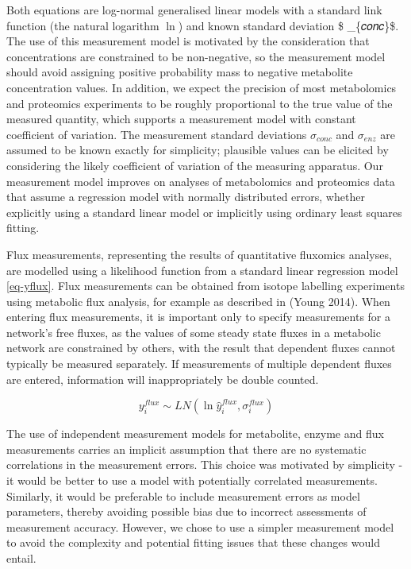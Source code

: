 \documentclass[journal=asbcd6,manuscript=article,layout=traditional]{achemso}
\begin{document}
Both equations are log-normal generalised linear models with a standard
link function (the natural logarithm \(\ln\)) and known standard
deviation \$ \sigma\_\{𝑐𝑜𝑛𝑐\}\$. The use of this measurement model is
motivated by the consideration that concentrations are constrained to be
non-negative, so the measurement model should avoid assigning positive
probability mass to negative metabolite concentration values. In
addition, we expect the precision of most metabolomics and proteomics
experiments to be roughly proportional to the true value of the measured
quantity, which supports a measurement model with constant coefficient
of variation. The measurement standard deviations \(\sigma_{𝑐𝑜𝑛𝑐}\) and
\(\sigma_{𝑒𝑛𝑧}\) are assumed to be known exactly for simplicity;
plausible values can be elicited by considering the likely coefficient
of variation of the measuring apparatus. Our measurement model improves
on analyses of metabolomics and proteomics data that assume a regression
model with normally distributed errors, whether explicitly using a
standard linear model or implicitly using ordinary least squares
fitting.

Flux measurements, representing the results of quantitative fluxomics
analyses, are modelled using a likelihood function from a standard
linear regression model \eqref{eq-yflux}. Flux measurements can be
obtained from isotope labelling experiments using metabolic flux
analysis, for example as described in (Young 2014). When entering flux
measurements, it is important only to specify measurements for a
network's free fluxes, as the values of some steady state fluxes in a
metabolic network are constrained by others, with the result that
dependent fluxes cannot typically be measured separately. If
measurements of multiple dependent fluxes are entered, information will
inappropriately be double counted.

\begin{equation}
y_i^{flux} \sim LN(\ln{\hat{y}_i^{flux}}, \sigma_i^{flux})\label{eq-yflux}
\end{equation}

The use of independent measurement models for metabolite, enzyme and
flux measurements carries an implicit assumption that there are no
systematic correlations in the measurement errors. This choice was
motivated by simplicity - it would be better to use a model with
potentially correlated measurements. Similarly, it would be preferable
to include measurement errors as model parameters, thereby avoiding
possible bias due to incorrect assessments of measurement accuracy.
However, we chose to use a simpler measurement model to avoid the
complexity and potential fitting issues that these changes would entail.
\end{document}
